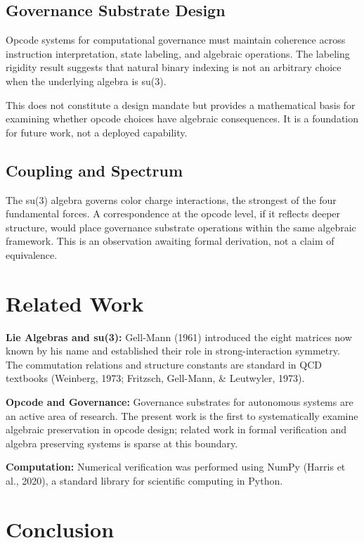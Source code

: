 \documentclass[11pt,a4paper]{article}
\begin{document}
\subsection{Governance Substrate Design}

Opcode systems for computational governance must maintain coherence across instruction interpretation, state labeling, and algebraic operations. The labeling rigidity result suggests that natural binary indexing is not an arbitrary choice when the underlying algebra is su(3).

This does not constitute a design mandate but provides a mathematical basis for examining whether opcode choices have algebraic consequences. It is a foundation for future work, not a deployed capability.

\subsection{Coupling and Spectrum}

The su(3) algebra governs color charge interactions, the strongest of the four fundamental forces. A correspondence at the opcode level, if it reflects deeper structure, would place governance substrate operations within the same algebraic framework. This is an observation awaiting formal derivation, not a claim of equivalence.

\section{Related Work}

\textbf{Lie Algebras and su(3):}
Gell-Mann (1961) introduced the eight matrices now known by his name and established their role in strong-interaction symmetry. The commutation relations and structure constants are standard in QCD textbooks (Weinberg, 1973; Fritzsch, Gell-Mann, \& Leutwyler, 1973).

\textbf{Opcode and Governance:}
Governance substrates for autonomous systems are an active area of research. The present work is the first to systematically examine algebraic preservation in opcode design; related work in formal verification and algebra preserving systems is sparse at this boundary.

\textbf{Computation:}
Numerical verification was performed using NumPy (Harris et al., 2020), a standard library for scientific computing in Python.

\section{Conclusion}
\end{document}
